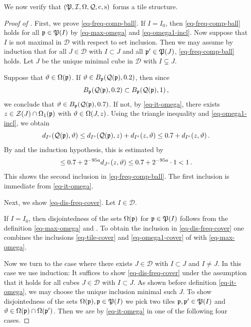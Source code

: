 We now verify that $({\mathfrak P},{\mathcal{I}},{\Omega},{\mathcal{Q}},{\mathrm{c}},{\mathrm{s}})$ forms a tile structure.
\begin{proof}[Proof of ]
    \leanok
    First, we prove \eqref{eq-freq-comp-ball}. If $I =I_0$, then \eqref{eq-freq-comp-ball} holds for all ${\mathfrak p} \in {\mathfrak P}(I)$ by \eqref{eq-max-omega} and \eqref{eq-omega1-incl}. Now suppose that $I$ is not maximal in $\mathcal{D}$ with respect to set inclusion. Then we may assume by induction that for all $J \in \mathcal{D}$ with $I \subset J$ and all ${\mathfrak p}' \in {\mathfrak P}(J)$, \eqref{eq-freq-comp-ball} holds. Let $J$ be the unique minimal cube in $\mathcal{D}$ with $I \subsetneq J$.

    Suppose that ${\vartheta} \in \Omega({\mathfrak p})$. If ${\vartheta}\in B_{{\mathfrak p}}(\mathcal{Q}({\mathfrak p}), 0.2)$, then since
    \begin{equation*}
        B_{{\mathfrak p}}(\mathcal{Q}({\mathfrak p}), 0.2)\subset B_{{\mathfrak p}}(\mathcal{Q}({\mathfrak p}), 1)\, ,
    \end{equation*}
    we conclude that ${\vartheta}\in B_{{\mathfrak p}}(\mathcal{Q}({\mathfrak p}), 0.7)$. If not, by \eqref{eq-it-omega}, there exists $z \in \mathcal{Z}(J) \cap \Omega_1({\mathfrak p})$ with ${\vartheta} \in \Omega(J,z)$. Using the triangle inequality and \eqref{eq-omega1-incl}, we obtain
    $$
        d_{I^\circ}({\mathcal{Q}}({\mathfrak p}),{\vartheta}) \le d_{I^\circ}({\mathcal{Q}}({\mathfrak p}), z) + d_{I^\circ}(z, {\vartheta}) \le 0.7 + d_{I^\circ}(z, {\vartheta})\,.
    $$
    By  and the induction hypothesis, this is estimated by
    $$
        \le 0.7 + 2^{-95a} d_{J^\circ}(z,{\vartheta}) \le 0.7 + 2^{-95a}\cdot 1 < 1\,.
    $$
    This shows the second inclusion in \eqref{eq-freq-comp-ball}. The first inclusion is immediate from \eqref{eq-it-omega}.

    Next, we show \eqref{eq-dis-freq-cover}. Let $I \in \mathcal{D}$.

    If $I = I_0$, then disjointedness of the sets ${\Omega}({\mathfrak p})$ for ${\mathfrak p} \in {\mathfrak P}(I)$ follows from the definition \eqref{eq-max-omega} and . To obtain the inclusion in \eqref{eq-dis-freq-cover} one combines the inclusions \eqref{eq-tile-cover} and \eqref{eq-omega1-cover}
    of  with \eqref{eq-max-omega}.

    Now we turn to the case where there exists $J \in \mathcal{D}$ with $I \subset J$ and $I\ne J$. In this case we use induction: It suffices to show \eqref{eq-dis-freq-cover} under the assumption that it holds for all cubes $J \in \mathcal{D}$ with $I \subset J$. As shown before definition \eqref{eq-it-omega}, we may choose the unique inclusion minimal such $J$. To show disjointedness of the sets ${\Omega}({\mathfrak p}), {\mathfrak p} \in {\mathfrak P}(I)$ we pick two tiles ${\mathfrak p}, {\mathfrak p}' \in {\mathfrak P}(I)$ and ${\vartheta} \in {\Omega}({\mathfrak p}) \cap {\Omega}({\mathfrak p}')$.
    Then we are by \eqref{eq-it-omega} in one of the following four cases.


\end{proof}
